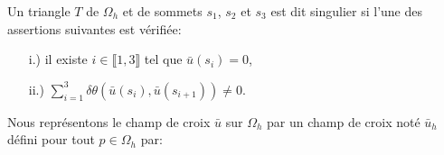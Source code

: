 \begin{definition}
 Un triangle $T$ de $\Omega_h$ et de sommets $s_1$, $s_2$ et $s_3$ est dit singulier si l'une des assertions suivantes est vérifiée:\\[-0.2cm]
 \begin{itemize}
  \item[i.)] il existe $i\in\llbracket 1, 3\rrbracket$ tel que $\bar{u}(s_i)=0$,\\[-0.2cm]
  \item[ii.)] $\sum_{i=1}^3\delta\theta(\bar{u}(s_i),\bar{u}(s_{i+1}))\neq 0$.
 \end{itemize}

\end{definition}
Nous représentons le champ de croix $\bar{u}$ sur $\Omega_h$ par un champ de croix noté $\bar{u}_h$ défini pour tout $p\in\Omega_h$ par:\\
